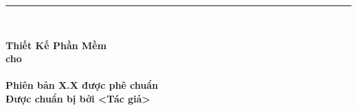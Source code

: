

\begin{titlepage}
    
    \vspace*{0.25cm}

    \noindent\rule{\textwidth}{4pt} \\[0cm]

    \begin{flushright}
        
        {\fontsize{32pt}{28pt}\selectfont \bfseries Thiết Kế Phần Mềm} \\[1.5cm]

        {\Large\bfseries cho} \\[1cm]

        {\fontsize{36pt}{30pt}\selectfont \bfseries <Dự Án>} \\[2cm]

        {\bfseries Phiên bản X.X được phê chuẩn} \\[1.2cm]

        {\bfseries Được chuẩn bị bởi <Tác giả>} \\[1.2cm]

        {\bfseries <Tổ chức>} \\[1.2cm]

        {\bfseries <Ngày tạo ra tài liệu>}

    \end{flushright}

\end{titlepage}